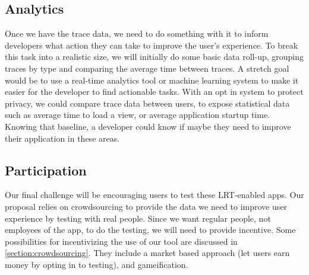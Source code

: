 \subsection{Analytics}
Once we have the trace data, we need to do something with it to inform developers
what action they can take to improve the user's experience. To break this task
into a realistic size, we will initially do some basic data roll-up, grouping
traces by type and comparing the average time between traces. A stretch goal
would be to use a real-time analytics tool or machine learning system 
to make it easier for the developer to find actionable tasks. With 
an opt in system to protect privacy, we could compare trace data between users,
to expose statistical data such as average time to load a view, or average 
application startup time. Knowing that baseline, a developer could know 
if maybe they need to improve their application in these areas.


\subsection{Participation}
Our final challenge will be encouraging users to test these LRT-enabled apps. Our
proposal relies on crowdsourcing to provide the data we need to improve user
experience by testing with real people. Since we want regular people, not employees
of the app, to do the testing, we will need to provide incentive. Some possibilities
for incentivizing the use of our tool are discussed in \ref{section:crowdsourcing}. They include
a market based approach (let users earn money by opting in to testing), and gameification.


